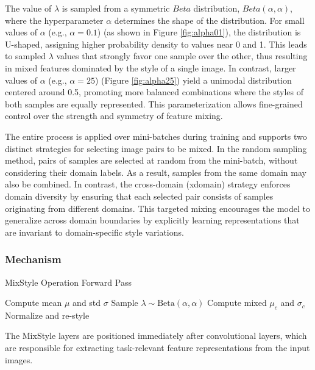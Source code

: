 The value of $\lambda$ is sampled from a symmetric $Beta$ distribution, $\text{$Beta$}(\alpha, \alpha)$, where the hyperparameter $\alpha$ determines the shape of the distribution. For small values of $\alpha$ (e.g., $\alpha = 0.1$) (as shown in Figure \ref{fig:alpha01}), the distribution is U-shaped, assigning higher probability density to values near 0 and 1. This leads to sampled $\lambda$ values that strongly favor one sample over the other, thus resulting in mixed features dominated by the style of a single image. In contrast, larger values of $\alpha$ (e.g., $\alpha = 25$) (Figure \ref{fig:alpha25}) yield a unimodal distribution centered around 0.5, promoting more balanced combinations where the styles of both samples are equally represented. This parameterization allows fine-grained control over the strength and symmetry of feature mixing.

The entire process is applied over mini-batches during training and supports two distinct strategies for selecting image pairs to be mixed. In the random sampling method, pairs of samples are selected at random from the mini-batch, without considering their domain labels. As a result, samples from the same domain may also be combined. In contrast, the cross-domain (xdomain) strategy enforces domain diversity by ensuring that each selected pair consists of samples originating from different domains. This targeted mixing encourages the model to generalize across domain boundaries by explicitly learning representations that are invariant to domain-specific style variations.

\subsubsection{Mechanism}\label{sususec:mechanismmixstyle}

\begin{algorithm}[H]\label{algorithm:mixstyle}
	\caption{MixStyle Operation Forward Pass}
	Compute mean $\mu$ and std $\sigma$\;
	Sample $\lambda \sim \text{Beta}(\alpha, \alpha)$\;
	Compute mixed $\mu_c$ and $\sigma_c$\;
	Normalize and re-style\;
\end{algorithm}

The MixStyle layers are positioned immediately after convolutional layers, which are responsible for extracting task-relevant feature representations from the input images.

